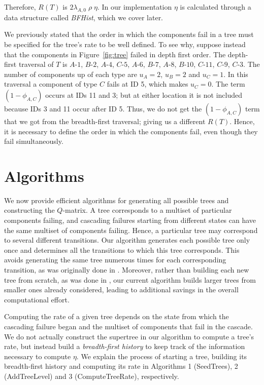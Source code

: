 \documentclass[12pt]{article}
\newcommand{\varName}[1]{\textrm{\it#1}}
\newcommand{\nodelabel}[2]{\mbox{$#1$-$#2$}}
\begin{document}
Therefore, $R(T)$ is $2 \lambda_{A, 0} \; \rho \; \eta$. In our implementation $\eta$ is calculated through a data structure called \varName{BFHist}, which we cover later. 

We previously stated that the order in which the components fail in a tree must be specified for the tree's rate to  be well defined. To see why, suppose instead that the components in Figure~\ref{fig:tree} failed in depth first order. The depth-first traversal of $T$ is \nodelabel{A}{1}, \nodelabel{B}{2}, \nodelabel{A}{4}, \nodelabel{C}{5}, \nodelabel{A}{6}, \nodelabel{B}{7}, \nodelabel{A}{8}, \nodelabel{B}{10}, \nodelabel{C}{11}, \nodelabel{C}{9}, \nodelabel{C}{3}. The number of components up of each type are $u_A = 2$, $u_B = 2$ and $u_C = 1$. In this traversal a component of type $C$ fails at ID 5, which makes $u_C = 0$. The term $(1 - \phi_{A, C})$ occurs at IDs 11 and 3; but at either location it is not included because IDs 3 and 11 occur after ID 5. Thus, we do not get the $(1 - \phi_{A, C})$ term that we got from the breadth-first traversal; giving us a different $R(T)$. Hence, it is necessary to define the order in which the components fail, even though they fail simultaneously.      

\section{Algorithms}
\label{sec:alg}

We now provide efficient algorithms for generating all possible trees and constructing the $Q$-matrix. A tree corresponds to a multiset of particular components failing, and cascading failures starting from different states can have the same multiset of components failing. Hence, a particular tree may correspond to several different transitions. Our algorithm generates each possible tree only once and determines all the transitions to which this tree corresponds. This avoids generating the same tree numerous times for each corresponding transition, as was originally done in \cite{ING:2009}. Moreover, rather than building each new tree from scratch, as was done in \cite{ING:2009}, our current algorithm builds larger trees from smaller ones already considered, leading to additional savings in the overall computational effort.

Computing the rate of a given tree depends on the state from which the cascading failure began and the multiset of components that fail in the cascade. We do not actually construct the supertree in our algorithm to compute a tree's rate, but instead build a \varName{breadth-first history} to keep track of the information necessary to compute $\eta$. We explain the process of starting a tree, building its breadth-first history and computing its rate in Algorithms 1 (SeedTrees), 2 (AddTreeLevel) and 3 (ComputeTreeRate), respectively.
\end{document}
